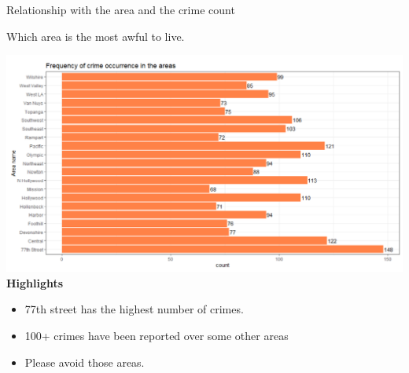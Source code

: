 \documentclass{beamer}\usepackage[]{graphicx}\usepackage[]{xcolor}
\makeatletter
\def\maxwidth{ %
  \ifdim\Gin@nat@width>\linewidth
    \linewidth
  \else
    \Gin@nat@width
  \fi
}
\newenvironment{knitrout}{}{} %
\makeatother
\begin{document}
\begin{frame}[fragile]{Relationship with the area and the crime count}

Which area is the most awful to live.

\begin{knitrout}
\color{fgcolor}
\includegraphics[width=\maxwidth]{figure/place.png} 
\end{knitrout}
\textbf{Highlights}
\begin{itemize}
\item 77th street has the highest number of crimes.
\item 100+ crimes have been reported over some other areas
\item Please avoid those areas.

\end{itemize}
\end{frame}
\end{document}
